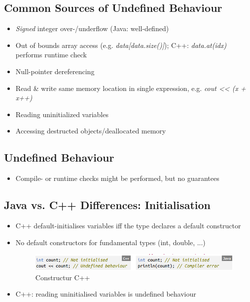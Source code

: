 \documentclass[a4paper,10pt]{article}
\begin{document}
\subsection{Common Sources of Undefined Behaviour}
\begin{itemize}
    \item \textit{Signed} integer over-/underflow (Java: well-defined)
    \item Out of bounds array access (e.g. \textit{data[data.size()]}); C++: \textit{data.at(idx)} performs runtime check
    \item Null-pointer dereferencing
    \item Read \& write same memory location in single expression, e.g. \textit{cout << (x + x++)}
    \item Reading uninitialized variables
    \item Accessing destructed objects/deallocated memory
\end{itemize}
\subsection{Undefined Behaviour}
\begin{itemize}
    \item Compile- or runtime checks might be performed, but no guarantees
\end{itemize}
\subsection{Java vs. C++ Differences: Initialisation}
\begin{itemize}
    \item C++ default-initialises variables iff the type declares a default constructor
    \item No default constructors for fundamental types (int, double, ...)
    \begin{figure}[htp]
        \centering
        \includegraphics[width=15cm]{e1.png}
        \caption{Constructur C++}
        \label{fig:enter-label}
    \end{figure}
    \item C++: reading uninitialised variables is undefined behaviour
\end{itemize}
\end{document}
